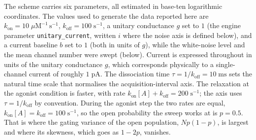 The scheme carries six parameters, all estimated in base-ten logarithmic
coordinates. The values used to generate the data reported here are
$k_{\mathrm{on}} = 10\;\mu\mathrm{M}^{-1}\,\mathrm{s}^{-1}$,
$k_{\mathrm{off}} = 100\;\mathrm{s}^{-1}$,
a unitary conductance $g$ set to $1$ (the engine parameter
\texttt{unitary\_current}, written $i$ where the noise axis is defined below), and a
current baseline $b$ set to $1$ (both in units of $g$),
while the white-noise level and the mean channel number were swept (below). Current
is expressed throughout in units of the unitary conductance $g$, which corresponds
physically to a single-channel current of roughly $1\;\mathrm{pA}$.
The dissociation time $\tau = 1/k_{\mathrm{off}} = 10\;\mathrm{ms}$ sets the natural
time scale that normalises the acquisition-interval axis. The relaxation at the
agonist condition is faster, with rate $k_{\mathrm{on}}[A] + k_{\mathrm{off}} =
200\;\mathrm{s}^{-1}$; the axis uses $\tau = 1/k_{\mathrm{off}}$ by convention.
During the agonist step the two rates are equal, $k_{\mathrm{on}}[A] =
k_{\mathrm{off}} = 100\;\mathrm{s}^{-1}$, so the open probability the sweep works at is
$p = 0.5$. That is where the gating variance of the open population, $Np(1-p)$, is
largest and where its skewness, which goes as $1-2p$, vanishes.

